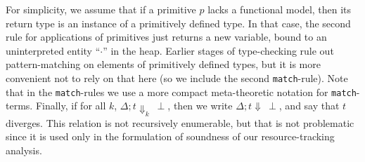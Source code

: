 \documentclass[9pt,natbib]{sigplanconf}
\begin{document}
 For simplicity, we assume that if a primitive $p$ lacks a functional
 model, then its return type is an instance of a primitively defined
 type.  In that case, the second rule for applications of primitives
 just returns a new variable, bound to an uninterpreted entity
 ``$\cdot$'' in the heap.  Earlier stages of type-checking rule out
 pattern-matching on elements of primitively defined types, but it is
 more convenient not to rely on that here (so we include the second
 \texttt{match}-rule).  Note that in the \texttt{match}-rules we use a
 more compact meta-theoretic notation for \texttt{match}-terms.
 Finally, if for all $k$, $\Delta; t\Downarrow_k\ \perp$, then we
 write $\Delta; t\Downarrow\ \perp$, and say that $t$ diverges. This
 relation is not recursively enumerable, but that is not problematic
 since it is used only in the formulation of soundness of our
 resource-tracking analysis.
\end{document}
